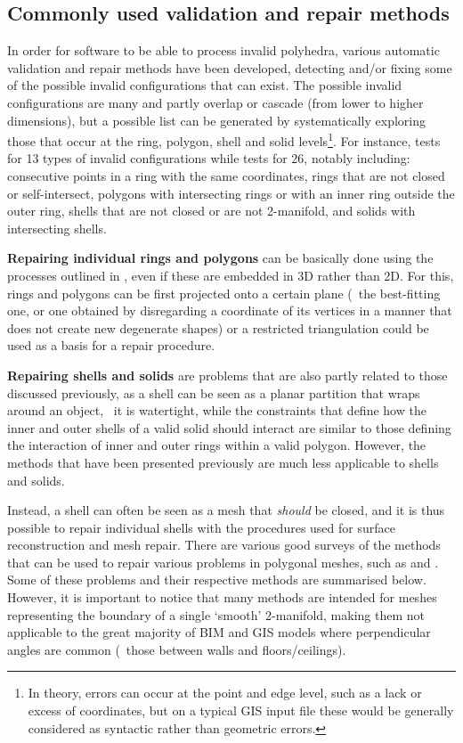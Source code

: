 \subsection{Commonly used validation and repair methods}

In order for software to be able to process invalid polyhedra, various automatic validation and repair methods have been developed, detecting and/or fixing some of the possible invalid configurations that can exist.
The possible invalid configurations are many and partly overlap or cascade (from lower to higher dimensions), but a possible list can be generated by systematically exploring those that occur at the ring, polygon, shell and solid levels\footnote{In theory, errors can occur at the point and edge level, such as a lack or excess of coordinates, but on a typical GIS input file these would be generally considered as syntactic rather than geometric errors.}.
For instance, \citet{Wagner13} tests for 13 types of invalid configurations while \citet{Ledoux13} tests for 26, notably including: consecutive points in a ring with the same coordinates, rings that are not closed or self-intersect, polygons with intersecting rings or with an inner ring outside the outer ring, shells that are not closed or are not 2-manifold, and solids with intersecting shells.

\textbf{Repairing individual rings and polygons} can be basically done using the processes outlined in , even if these are embedded in 3D rather than 2D.
For this, rings and polygons can be first projected onto a certain plane (\eg\ the best-fitting one, or one obtained by disregarding a coordinate of its vertices in a manner that does not create new degenerate shapes) or a restricted triangulation \citep[Ch.~13]{Cheng12} could be used as a basis for a repair procedure.

\textbf{Repairing shells and solids} are problems that are also partly related to those discussed previously, as
a shell can be seen as a planar partition that wraps around an object, \ie\ it is watertight, while the constraints that define how the inner and outer shells of a valid solid should interact are similar to those defining the interaction of inner and outer rings within a valid polygon.
However, the methods that have been presented previously are much less applicable to shells and solids.

Instead, a shell can often be seen as a mesh that \emph{should} be closed, and it is thus possible to repair individual shells with the procedures used for surface reconstruction and mesh repair.
There are various good surveys of the methods that can be used to repair various problems in polygonal meshes, such as \citet{Ju09} and \citet{Attene13}.
Some of these problems and their respective methods are summarised below.
However, it is important to notice that many methods are intended for meshes representing the boundary of a single `smooth' 2-manifold, making them not applicable to the great majority of BIM and GIS models where perpendicular angles are common (\eg\ those between walls and floors/ceilings).

